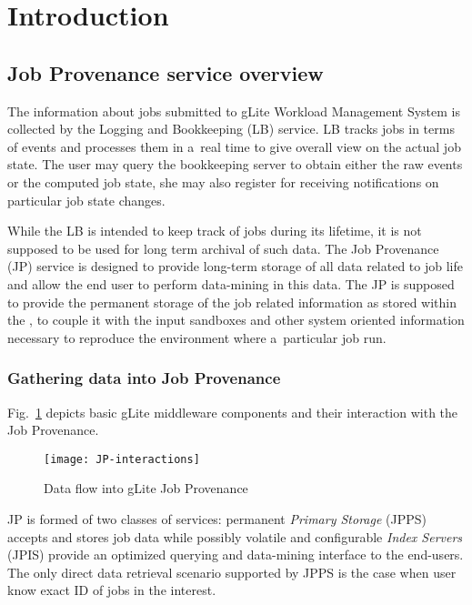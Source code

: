 \section{Introduction}


\subsection{Job Provenance service overview}
The information about jobs submitted to gLite Workload Management
System is collected by the Logging and Bookkeeping (LB) service.
LB tracks jobs in terms of events and processes them in
a~real time to give overall view on the actual job state. The user may
query the bookkeeping server to obtain either the raw events or the
computed job state, she may also register for receiving notifications
on particular job state changes.

While the LB is intended to keep track of jobs during its lifetime, it
is not supposed to be used for long term archival of such data. The
Job Provenance (JP) service is designed to provide long-term storage
of all data related to job life and allow the end user to perform
data-mining in this data.
The JP is supposed to provide the permanent storage of
the job related information as stored within the \LB, to couple it with
the input sandboxes and other system oriented information necessary to
reproduce the environment where a~particular job run.

\subsubsection{Gathering data into Job Provenance}
Fig.~\ref{fig:psinter} depicts basic gLite middleware components and
their interaction with the Job Provenance.

\begin{figure}[htpb]
  \centering
  \texttt{[image: JP-interactions]}
  \caption{Data flow into gLite Job Provenance}
  \label{fig:psinter}
\end{figure}

JP is formed of two classes of services: permanent \emph{Primary
Storage} (JPPS) accepts and stores job data while possibly volatile
and configurable \emph{Index Servers} (JPIS) provide an optimized
querying and data-mining interface to the end-users.  The only direct
data retrieval scenario supported by JPPS is the case when user know exact ID
of jobs in the interest.

